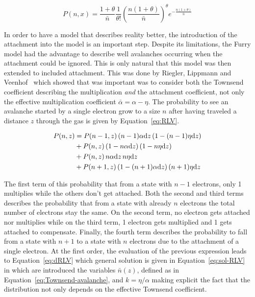 	\begin{equation}
	\label{eq:Polya-P}
	P(n,x) = \frac{1+\theta}{\bar{n}}\frac{1}{\theta !} \left( \frac{n(1+\theta)}{\bar{n}} \right)^\theta e^{-\frac{n(1+\theta)}{\bar{n}}}
	\end{equation}
	
	In order to have a model that describes reality better, the introduction of the attachment into the model is an important step. Despite its limitations, the Furry model had the advantage to describe well avalanches occurring when the attachment could be ignored. This is only natural that this model was then extended to included attachment. This was done by Riegler, Lippmann and Veenhof~\cite{RIEGLER2003} which showed that was important was to consider both the Townsend coefficient describing the multiplication \textit{and} the attachment coefficient, not only the effective multiplication coefficient $\bar{\alpha} = \alpha - \eta$. The probability to see an avalanche started by a single electron grow to a size $n$ after having traveled a distance $z$ through the gas is given by Equation~\ref{eq:RLV}.
	
	\begin{equation}
	\label{eq:RLV}
		\begin{aligned}
		P(n,z) &= P(n-1,z) \, (n-1)\alpha\mathrm{d}{z} \, (1-(n-1)\eta\mathrm{d}{z})\\
			   &+ P(n,z)   \, (1-n\alpha\mathrm{d}{z}) \, (1-n\eta\mathrm{d}{z})\\
			   &+ P(n,z)   \, n\alpha\mathrm{d}{z} \, n\eta\mathrm{d}{z}\\
			   &+ P(n+1,z) \, (1-(n+1)\alpha\mathrm{d}{z}) \, (n+1)\eta\mathrm{d}{z}
		\end{aligned}
	\end{equation}
	
	The first term of this probability that from a state with $n-1$ electrons, only 1 multiplies while the others don't get attached. Both the second and third terms describes the probability that from a state with already $n$ electrons the total number of electrons stay the same. On the second term, no electron gets attached nor multiplies while on the third term, 1 electron gets multiplied and 1 gets attached to compensate. Finally, the fourth term describes the probability to fall from a state with $n+1$ to a state with $n$ electrons due to the attachment of a single electron. At the first order, the evaluation of the previous expression leads to Equation~\ref{eq:dRLV} which general solution is given in Equation~\ref{eq:sol-RLV} in which are introduced the variables $\bar{n}(z)$, defined as in Equation~\ref{eq:Townsend-avalanche}, and $k = \eta/\alpha$ making explicit the fact that the distribution not only depends on the effective Townsend coefficient.
	
